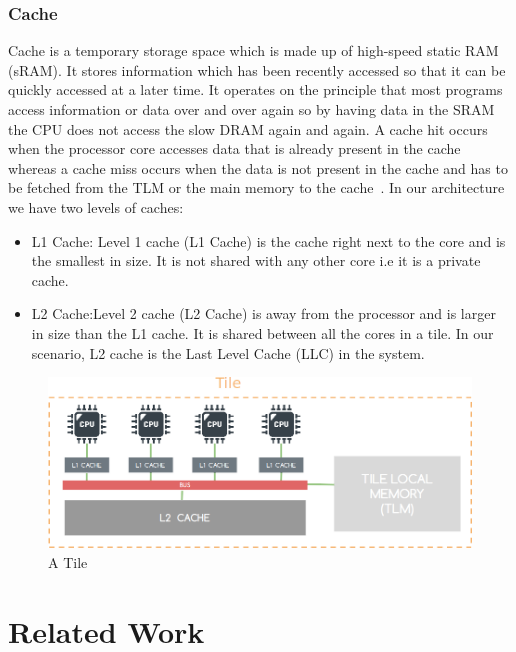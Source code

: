 \documentclass{listhesis}
\begin{document}
\subsubsection{Cache}
Cache is a temporary storage space which is made up of high-speed static RAM (sRAM). It stores information which has been recently accessed so that it can be quickly accessed at a later time. It operates on the principle that most programs access information or data over and over again so by having data in the SRAM the CPU does not access the slow DRAM again and again. A cache hit occurs when the processor core accesses data that is already present in the cache whereas a cache miss occurs when the data is not present in the cache and has to be fetched from the TLM or the main memory to the cache~\cite{iffatseminarpaper}. In our architecture we have two levels of caches:
\begin{itemize}
  \item L1 Cache: Level 1 cache (L1 Cache) is the cache right next to the core and is the smallest in size. It is not shared with any other core i.e it is a private cache.
  \item L2 Cache:Level 2 cache (L2 Cache) is away from the processor and is larger in size than the L1 cache. It is shared between all the cores in a tile. In our scenario, L2 cache is the Last Level Cache (LLC) in the system.
\end{itemize}
\begin{figure}
  \includegraphics[width=\linewidth]{tile.png}
  \centering
  \caption{A Tile}
  \label{fig:tile}
\end{figure}
\section{Related Work}
\end{document}
